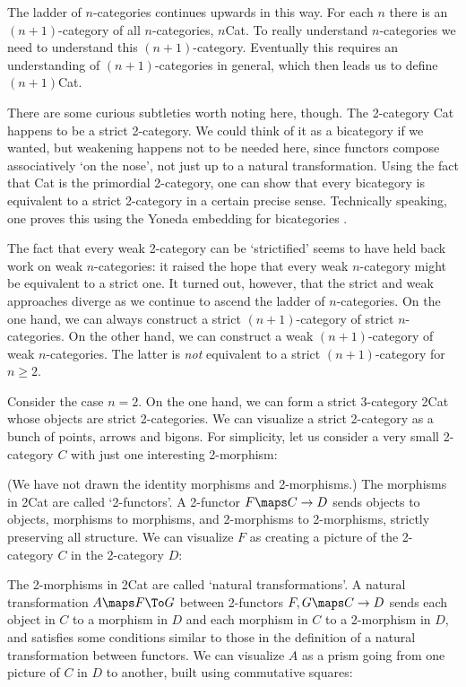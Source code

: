 The ladder of $n$-categories continues upwards in this way.  For each
$n$ there is an $(n+1)$-category of all $n$-categories, $n$Cat.  To
really understand $n$-categories we need to understand this
$(n+1)$-category.  Eventually this requires an understanding of
$(n+1)$-categories in general, which then leads us to define $(n+1)$Cat.

There are some curious subtleties worth noting here, though.  The
2-category Cat happens to be a strict 2-category.  We could think of it
as a bicategory if we wanted, but weakening happens not to be needed
here, since functors compose associatively `on the nose', not just up to
a natural transformation.  Using the fact that Cat is the primordial
2-category, one can show that every bicategory is equivalent to a
strict 2-category in a certain precise sense.  Technically speaking, one
proves this using the Yoneda embedding for bicategories \cite{GPS}.

The fact that every weak 2-category can be `strictified' seems to have
held back work on weak $n$-categories: it raised the hope that every
weak $n$-category might be equivalent to a strict one.  It turned out,
however, that the strict and weak approaches diverge as we continue to
ascend the ladder of $n$-categories.  On the one hand, we can always
construct a strict $(n+1)$-category of strict $n$-categories.  On the
other hand, we can construct a weak $(n+1)$-category of weak
$n$-categories.  The latter is {\it not} equivalent to a strict
$(n+1)$-category for $n \ge 2$.

Consider the case $n = 2$.  On the one hand, we can form a strict
3-category 2Cat whose objects are strict 2-categories.  We can
visualize a strict 2-category as a bunch of points, arrows and bigons.
For simplicity, let us consider a very small 2-category $C$ with just
one interesting 2-morphism:

\medskip
\centerline{\epsfysize=1.0in}
\medskip

\noindent (We have not drawn the identity morphisms and 2-morphisms.)
The morphisms in 2Cat are called `2-functors'.  A 2-functor $F \maps 
C \to D$ sends objects to objects, morphisms to morphisms, 
and 2-morphisms to 2-morphisms, strictly preserving all structure.  
We can visualize $F$ as creating a picture of the 
2-category $C$ in the 2-category $D$:

\medskip
\centerline{\epsfysize=1.0in}
\medskip

\noindent The 2-morphisms in 2Cat are called `natural transformations'.  
A natural transformation $A \maps F \To G$ between 2-functors 
$F,G \maps C \to D$ sends each object in $C$ to a morphism in $D$
and each morphism in $C$ to a 2-morphism in $D$, and satisfies
some conditions similar to those in the definition of a natural transformation 
between functors.   We can visualize $A$ as a prism going from one picture
of $C$ in $D$ to another, built using commutative squares:


